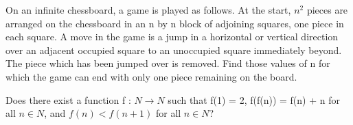 \item On an infinite chessboard, a game is played as follows. At the start, $n^2$ pieces are arranged on the chessboard in an n by n block of adjoining squares, one piece in each square. A move in the game is a jump in a horizontal or vertical direction over an adjacent occupied square to an unoccupied square immediately beyond. The piece which has been jumped over is removed. Find those values of n for which the game can end with only one piece remaining on the board.

\item Does there exist a function f : $N \rightarrow N$ such that f(1) = 2, f(f(n)) = f(n) + n for all $n \in N$, and $f(n) < f(n + 1)$ for all $n \in N$?




